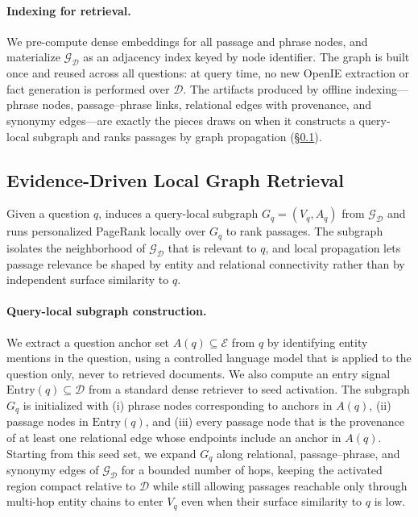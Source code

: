 \paragraph{Indexing for retrieval.}
We pre-compute dense embeddings for all passage and phrase nodes, and
materialize $\mathcal{G}_{\mathcal{D}}$ as an adjacency index keyed by
node identifier. The graph is built once and reused across all questions:
at query time, no new OpenIE extraction or fact generation is performed
over $\mathcal{D}$. The artifacts produced by offline indexing---phrase
nodes, passage--phrase links, relational edges with provenance, and
synonymy edges---are exactly the pieces \methodname{} draws on when it
constructs a query-local subgraph and ranks passages by graph propagation
(\S\ref{sec:method:retrieval}).

\subsection{Evidence-Driven Local Graph Retrieval}
\label{sec:method:retrieval}

Given a question $q$, \methodname{} induces a query-local subgraph
$G_q = (V_q, A_q)$ from $\mathcal{G}_{\mathcal{D}}$ and runs personalized
PageRank locally over $G_q$ to rank passages. The subgraph isolates the
neighborhood of $\mathcal{G}_{\mathcal{D}}$ that is relevant to $q$, and
local propagation lets passage relevance be shaped by entity and
relational connectivity rather than by independent surface similarity to
$q$.

\paragraph{Query-local subgraph construction.}
We extract a question anchor set $A(q) \subseteq \mathcal{E}$ from $q$ by
identifying entity mentions in the question, using a controlled language
model that is applied to the question only, never to retrieved documents.
We also compute an entry signal $\mathrm{Entry}(q) \subseteq \mathcal{D}$
from a standard dense retriever to seed activation. The subgraph $G_q$ is
initialized with (i) phrase nodes corresponding to anchors in $A(q)$, (ii)
passage nodes in $\mathrm{Entry}(q)$, and (iii) every passage node that is
the provenance of at least one relational edge whose endpoints include an
anchor in $A(q)$. Starting from this seed set, we expand $G_q$ along
relational, passage--phrase, and synonymy edges of
$\mathcal{G}_{\mathcal{D}}$ for a bounded number of hops, keeping the
activated region compact relative to $\mathcal{D}$ while still allowing
passages reachable only through multi-hop entity chains to enter $V_q$
even when their surface similarity to $q$ is low.

